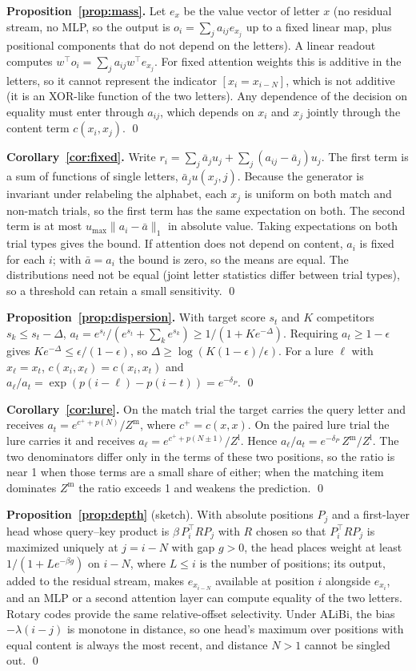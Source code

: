 \documentclass{article}
\begin{document}
\textbf{Proposition~\ref{prop:mass}.} Let $e_x$ be the value vector of letter $x$ (no residual stream, no MLP, so the output is $o_i=\sum_j a_{ij}e_{x_j}$ up to a fixed linear map, plus positional components that do not depend on the letters). A linear readout computes $w^\top o_i=\sum_j a_{ij}w^\top e_{x_j}$. For fixed attention weights this is additive in the letters, so it cannot represent the indicator $[x_i=x_{i-N}]$, which is not additive (it is an XOR-like function of the two letters). Any dependence of the decision on equality must enter through $a_{ij}$, which depends on $x_i$ and $x_j$ jointly through the content term $c(x_i,x_j)$. \qed

\textbf{Corollary~\ref{cor:fixed}.} Write $r_i=\sum_j\bar a_ju_j+\sum_j(a_{ij}-\bar a_j)u_j$. The first term is a sum of functions of single letters, $\bar a_j u(x_j,j)$. Because the generator is invariant under relabeling the alphabet, each $x_j$ is uniform on both match and non-match trials, so the first term has the same expectation on both. The second term is at most $u_{\max}\|a_i-\bar a\|_1$ in absolute value. Taking expectations on both trial types gives the bound. If attention does not depend on content, $a_i$ is fixed for each $i$; with $\bar a=a_i$ the bound is zero, so the means are equal. The distributions need not be equal (joint letter statistics differ between trial types), so a threshold can retain a small sensitivity. \qed

\textbf{Proposition~\ref{prop:dispersion}.} With target score $s_t$ and $K$ competitors $s_k\le s_t-\Delta$, $a_t=e^{s_t}/(e^{s_t}+\sum_k e^{s_k})\ge 1/(1+Ke^{-\Delta})$. Requiring $a_t\ge1-\epsilon$ gives $Ke^{-\Delta}\le\epsilon/(1-\epsilon)$, so $\Delta\ge\log(K(1-\epsilon)/\epsilon)$. For a lure $\ell$ with $x_\ell=x_t$, $c(x_i,x_\ell)=c(x_i,x_t)$ and $a_\ell/a_t=\exp(p(i-\ell)-p(i-t))=e^{-\delta_P}$. \qed

\textbf{Corollary~\ref{cor:lure}.} On the match trial the target carries the query letter and receives $a_t=e^{c^+ +p(N)}/Z^{\text{m}}$, where $c^+=c(x,x)$. On the paired lure trial the lure carries it and receives $a_\ell=e^{c^+ +p(N\pm1)}/Z^{\text{l}}$. Hence $a_\ell/a_t=e^{-\delta_P}\,Z^{\text{m}}/Z^{\text{l}}$. The two denominators differ only in the terms of these two positions, so the ratio is near 1 when those terms are a small share of either; when the matching item dominates $Z^{\text{m}}$ the ratio exceeds 1 and weakens the prediction. \qed

\textbf{Proposition~\ref{prop:depth}} (sketch). With absolute positions $P_j$ and a first-layer head whose query--key product is $\beta\,P_i^\top R P_j$ with $R$ chosen so that $P_i^\top RP_j$ is maximized uniquely at $j=i-N$ with gap $g>0$, the head places weight at least $1/(1+Le^{-\beta g})$ on $i-N$, where $L\le i$ is the number of positions; its output, added to the residual stream, makes $e_{x_{i-N}}$ available at position $i$ alongside $e_{x_i}$, and an MLP or a second attention layer can compute equality of the two letters. Rotary codes provide the same relative-offset selectivity. Under ALiBi, the bias $-\lambda(i-j)$ is monotone in distance, so one head's maximum over positions with equal content is always the most recent, and distance $N>1$ cannot be singled out. \qed
\end{document}
